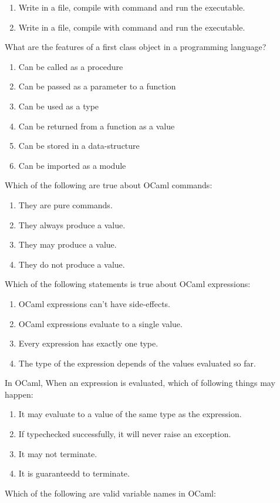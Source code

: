 \documentclass[addpoints,11pt]{exam}
\begin{document}
\begin{questions}
\begin{enumerate}
\item Write in a file, compile with \lstinline@ocamlopt@ command and run the executable.
\item Write in a file, compile with \lstinline@ocamlcom@ command and run the executable.
\end{enumerate}\question What are the features of a first class object in a programming language?
\begin{enumerate}
\item Can be called as a procedure
\item Can be passed as a parameter to a function
\item Can be used as a type
\item Can be returned from a function as a value
\item Can be stored in a data-structure
\item Can be imported as a module
\end{enumerate}\question Which of the following are true about OCaml commands:
\begin{enumerate}
\item They are pure commands.
\item They always produce a value.
\item They may produce a value.
\item They do not produce a value.
\end{enumerate}\question Which of the following statements is true about OCaml expressions:
\begin{enumerate}
\item OCaml expressions can't have side-effects.
\item OCaml expressions evaluate to a single value.
\item Every expression has exactly one type.
\item The type of the expression depends of the values evaluated so far.
\end{enumerate}\question In OCaml, When an expression is evaluated, which of following things may happen:
\begin{enumerate}
\item It may evaluate to a value of the same type as the expression.
\item If typechecked successfully, it will never raise an exception.
\item It may not terminate.
\item It is guaranteedd to terminate.
\end{enumerate}
\question Which of the following are valid variable names in OCaml:

\end{questions}
\end{document}
